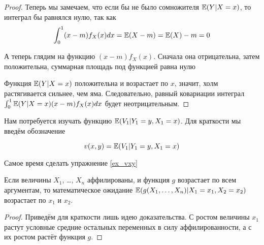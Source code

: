 \begin{proof}
Теперь мы замечаем, что если бы не было сомножителя $ \operatorname{\mathbb{E}}(Y|X=x) $, то интеграл бы равнялся нулю, так как
\begin{equation}
\int_{0}^{1}(x-m)f_{X}(x)dx=\operatorname{\mathbb{E}}(X-m)=\operatorname{\mathbb{E}}(X)-m=0
\end{equation}

А теперь глядим на функцию $ (x-m)f_{X}(x) $. Сначала она отрицательна, затем положительна, суммарная площадь под функцией равна нулю


Функция $ \operatorname{\mathbb{E}}(Y|X=x) $ положительна и возрастает по $ x $, значит, холм растягивается сильнее, чем яма. Следовательно, равный ковариации интеграл $ \int_{0}^{1}\operatorname{\mathbb{E}}(Y|X=x)(x-m)f_{X}(x)dx $ будет неотрицательным.


\end{proof}



Нам потребуется изучать функцию $ \operatorname{\mathbb{E}}(V_{1}|Y_{1}=y, X_{1}=x) $.  Для краткости мы введём обозначение

\begin{mydef}
\begin{equation}
v(x,y)=\operatorname{\mathbb{E}}(V_{1}|Y_{1}=y, X_{1}=x)
\end{equation}
\end{mydef}

Самое время сделать упражнение \ref{ex_vxy}

\begin{myth}
\label{aff_multi_f}
Если величины $ X_{1} $, \ldots, $ X_{n} $ аффилированы, и функция $g$ возрастает по всем аргументам, то математическое ожидание $\operatorname{\mathbb{E}}(g(X_{1},\ldots,X_{n})|X_{1}=x_{1},X_{2}=x_{2}) $ возрастает по $ x_{1} $ и $ x_{2} $.
\end{myth}

\begin{proof}
Приведём для краткости лишь идею доказательства. С ростом величины $ x_{1} $ растут условные средние остальных переменных в силу аффилированности, а с их ростом растёт функция $ g $.
\end{proof}

